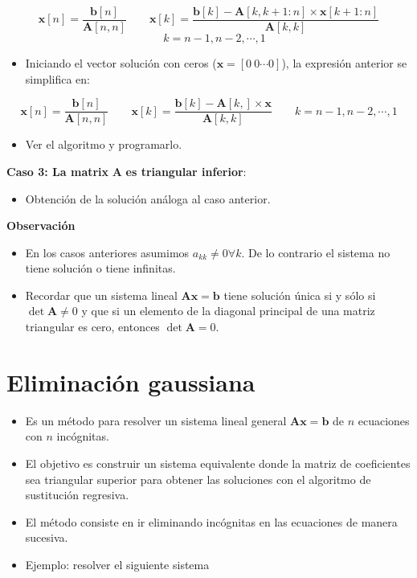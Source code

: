 \documentclass[]{book}
\providecommand{\tightlist}{%
  \setlength{\itemsep}{0pt}\setlength{\parskip}{0pt}}
\begin{document}
\[
\mathbf{x}[n] = \frac{\mathbf{b}[n]}{\mathbf{A}[n,n]} \qquad \mathbf{x}[k] = \frac{\mathbf{b}[k] - \mathbf{A}[k, k+1 : n] \times \mathbf{x}[k+1 : n]}{\mathbf{A}[k,k]}
\]
\[
\quad k = n-1, n-2, \cdots, 1
\]

\begin{itemize}
\tightlist
\item
  Iniciando el vector solución con ceros (\(\mathbf{x} = [0 ~ 0 \cdots 0]\)), la expresión anterior se simplifica en:
\end{itemize}

\[
\mathbf{x}[n] = \frac{\mathbf{b}[n]}{\mathbf{A}[n,n]} \qquad \mathbf{x}[k] = \frac{\mathbf{b}[k] - \mathbf{A}[k, ] \times \mathbf{x}}{\mathbf{A}[k,k]}
\qquad k = n-1, n-2, \cdots, 1
\]

\begin{itemize}
\tightlist
\item
  Ver el algoritmo y programarlo.
\end{itemize}

\textbf{Caso 3: La matrix} \(\mathbf{A}\) \textbf{es triangular inferior}:

\begin{itemize}
\tightlist
\item
  Obtención de la solución análoga al caso anterior.
\end{itemize}

\textbf{Observación}

\begin{itemize}
\tightlist
\item
  En los casos anteriores asumimos \(a_{kk} \neq 0 \forall k\). De lo contrario el sistema no tiene solución o tiene infinitas.
\item
  Recordar que un sistema lineal \(\mathbf{Ax=b}\) tiene solución única si y sólo si \(\det \mathbf{A} \neq 0\) y que si un elemento de la diagonal principal de una matriz triangular es cero, entonces \(\det \mathbf{A} = 0\).
\end{itemize}

\hypertarget{eliminaciuxf3n-gaussiana}{%
\section{Eliminación gaussiana}\label{eliminaciuxf3n-gaussiana}}

\begin{itemize}
\tightlist
\item
  Es un método para resolver un sistema lineal general \(\mathbf{Ax=b}\) de \(n\) ecuaciones con \(n\) incógnitas.
\item
  El objetivo es construir un sistema equivalente donde la matriz de coeficientes sea triangular superior para obtener las soluciones con el algoritmo de sustitución regresiva.
\item
  El método consiste en ir eliminando incógnitas en las ecuaciones de manera sucesiva.
\item
  Ejemplo: resolver el siguiente sistema
\end{itemize}
\end{document}
